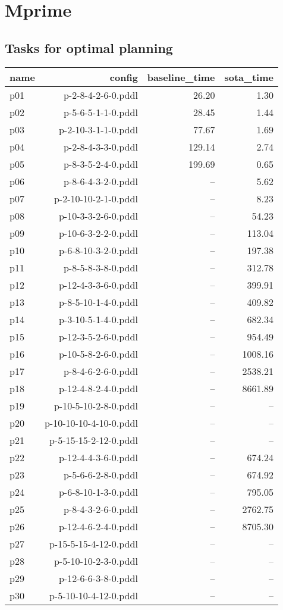 \documentclass{article}
\begin{document}
                \newpage \section{Mprime}
                    \subsection*{Tasks for optimal planning}
                    
                            \begin{center}
                            \scriptsize
                            \begin{tabular}{@{}l|r|r|r@{}}
                            name & config & baseline\_time & sota\_time\\\midrule
                              p01& p-2-8-4-2-6-0.pddl&26.20&1.30\\
  p02& p-5-6-5-1-1-0.pddl&28.45&1.44\\
  p03& p-2-10-3-1-1-0.pddl&77.67&1.69\\
  p04& p-2-8-4-3-3-0.pddl&129.14&2.74\\
  p05& p-8-3-5-2-4-0.pddl&199.69&0.65\\
  p06& p-8-6-4-3-2-0.pddl&--&5.62\\
  p07& p-2-10-10-2-1-0.pddl&--&8.23\\
  p08& p-10-3-3-2-6-0.pddl&--&54.23\\
  p09& p-10-6-3-2-2-0.pddl&--&113.04\\
  p10& p-6-8-10-3-2-0.pddl&--&197.38\\
  p11& p-8-5-8-3-8-0.pddl&--&312.78\\
  p12& p-12-4-3-3-6-0.pddl&--&399.91\\
  p13& p-8-5-10-1-4-0.pddl&--&409.82\\
  p14& p-3-10-5-1-4-0.pddl&--&682.34\\
  p15& p-12-3-5-2-6-0.pddl&--&954.49\\
  p16& p-10-5-8-2-6-0.pddl&--&1008.16\\
  p17& p-8-4-6-2-6-0.pddl&--&2538.21\\
  p18& p-12-4-8-2-4-0.pddl&--&8661.89\\
  p19& p-10-5-10-2-8-0.pddl&--&--\\
  p20& p-10-10-10-4-10-0.pddl&--&--\\
  p21& p-5-15-15-2-12-0.pddl&--&--\\
  p22& p-12-4-4-3-6-0.pddl&--&674.24\\
  p23& p-5-6-6-2-8-0.pddl&--&674.92\\
  p24& p-6-8-10-1-3-0.pddl&--&795.05\\
  p25& p-8-4-3-2-6-0.pddl&--&2762.75\\
  p26& p-12-4-6-2-4-0.pddl&--&8705.30\\
  p27& p-15-5-15-4-12-0.pddl&--&--\\
  p28& p-5-10-10-2-3-0.pddl&--&--\\
  p29& p-12-6-6-3-8-0.pddl&--&--\\
  p30& p-5-10-10-4-12-0.pddl&--&--
                            \end{tabular}
                            \end{center}
                    
\end{document}
